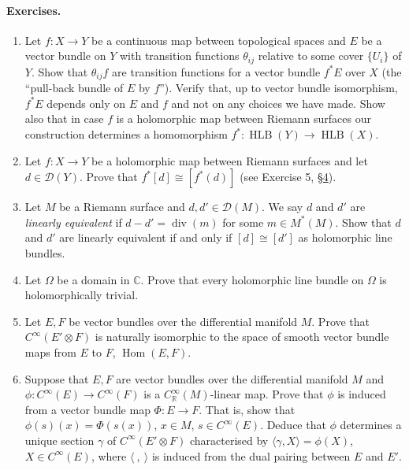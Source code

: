 \paragraph*{Exercises.}
\begin{enumerate}
\item Let $f:X\to Y$ be a continuous map between topological spaces and $E$ be a vector bundle on $Y$ with transition functions $\theta_{ij}$ relative to some cover $\{U_i\}$ of $Y$. Show that $\theta_{ij}f$ are transition functions for a vector bundle $f^*E$ over $X$ (the ``pull-back bundle of $E$ by $f$''). Verify that, up to vector bundle isomorphism, $f^*E$ depends only on $E$ and $f$ and not on any choices we have made. Show also that in case $f$ is a holomorphic map between Riemann surfaces our construction determines a homomorphism $f^*:\operatorname{HLB}(Y)\to\operatorname{HLB}(X)$.
\item Let $f:X\to Y$ be a holomorphic map between Riemann surfaces and let $d\in\mathcal D(Y)$. Prove that $f^*[d]\cong[f^*(d)]$ (see Exercise 5, \hyperref[sec:1:4]{\S4}).
\item Let $M$ be a Riemann surface and $d,d'\in\mathcal D(M)$. We say $d$ and $d'$ are \emph{linearly equivalent} if $d-d'=\operatorname{div}(m)$ for some $m\in M^*(M)$. Show that $d$ and $d'$ are linearly equivalent if and only if $[d]\cong[d']$ as holomorphic line bundles.
\item Let $\Omega$ be a domain in $\mathbb C$. Prove that every holomorphic line bundle on $\Omega$ is holomorphically trivial.
\item Let $E,F$ be vector bundles over the differential manifold $M$. Prove that $C^\infty(E'\otimes F)$ is naturally isomorphic to the space of smooth vector bundle maps from $E$ to $F$, $\operatorname{Hom}(E,F)$.
\item Suppose that $E,F$ are vector bundles over the differential manifold $M$ and $\phi:C^\infty(E)\to C^\infty(F)$ is a $C_{\mathbb R}^\infty(M)$-linear map. Prove that $\phi$ is induced from a vector bundle map $\Phi:E\to F$. That is, show that $\phi(s)(x)=\Phi(s(x))$, $x\in M$, $s\in C^\infty(E)$. Deduce that $\phi$ determines a unique section $\gamma$ of $C^\infty(E'\otimes F)$ characterised by $\langle\gamma,X\rangle=\phi(X)$, $X\in C^\infty(E)$, where $\langle\ ,\ \rangle$ is induced from the dual pairing between $E$ and $E'$.
\end{enumerate}

